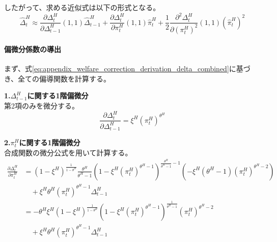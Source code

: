 したがって、求める近似式は以下の形式となる。
\begin{equation}
    \hat{\Delta}_t^H\approx\frac{\partial\Delta_t^H}{\partial\Delta_{t-1}^H}(1,1)\hat{\Delta}_{t-1}^H+\frac{\partial\Delta_t^H}{\partial\pi_t^H}(1,1)\hat{\pi}_t^H+\frac{1}{2}\frac{\partial^2\Delta_t^H}{\partial(\pi_t^H)^2}(1,1)(\hat{\pi}_t^H)^2
\label{eq:appendix_welfare_correction_derivation_delta_structure}
\end{equation}

\paragraph{偏微分係数の導出}\label{sec:appendix_welfare_correction_derivation_diff_p1}

まず、式\eqref{eq:appendix_welfare_correction_derivation_delta_combined}に基づき、全ての偏導関数を計算する。

\textbf{1.\(\Delta_{t-1}^H\)に関する1階偏微分} \\
第2項のみを微分する。
\begin{equation}
    \frac{\partial\Delta_t^H}{\partial\Delta_{t-1}^H}=\xi^H(\pi_t^H)^{\theta^H}
\label{eq:appendix_welfare_correction_derivation_partial_delta_lag}
\end{equation}

\textbf{2.\(\pi_t^H\)に関する1階偏微分} \\
合成関数の微分公式を用いて計算する。
\begin{align}
    \frac{\partial\Delta_t^H}{\partial\pi_t^H}&=(1-\xi^H)^{\frac{1}{1-\theta^H}}\frac{\theta^H}{\theta^H-1}\left(1-\xi^H(\pi_t^H)^{\theta^H-1}\right)^{\frac{\theta^H}{\theta^H-1}-1}\left(-\xi^H(\theta^H-1)(\pi_t^H)^{\theta^H-2}\right) \label{eq:appendix_welfare_correction_derivation_pi_first_diff_step1} \\
    &\quad+\xi^H\theta^H(\pi_t^H)^{\theta^H-1}\Delta_{t-1}^H \label{eq:appendix_welfare_correction_derivation_pi_first_diff_step2} \\
    &=-\theta^H\xi^H(1-\xi^H)^{\frac{1}{1-\theta^H}}\left(1-\xi^H(\pi_t^H)^{\theta^H-1}\right)^{\frac{1}{\theta^H-1}}(\pi_t^H)^{\theta^H-2} \label{eq:appendix_welfare_correction_derivation_pi_first_diff_step3} \\
    &\quad+\xi^H\theta^H(\pi_t^H)^{\theta^H-1}\Delta_{t-1}^H
\label{eq:appendix_welfare_correction_derivation_pi_first_diff}
\end{align}

